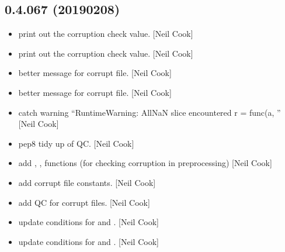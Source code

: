 \documentclass[a4paper,10pt,english]{report}
\begin{document}
\subsection{0.4.067 (2019\sphinxhyphen{}02\sphinxhyphen{}08)}
\label{\detokenize{misc/changelog:id210}}\begin{itemize}
\item {} 
 \sphinxhyphen{} print out the corruption check value. {[}Neil
Cook{]}

\item {} 
 \sphinxhyphen{} print out the corruption check value. {[}Neil
Cook{]}

\item {} 
 \sphinxhyphen{} better message for corrupt file. {[}Neil
Cook{]}

\item {} 
 \sphinxhyphen{} better message for corrupt file. {[}Neil
Cook{]}

\item {} 
 \sphinxhyphen{} catch warning “RuntimeWarning: All\sphinxhyphen{}NaN slice
encountered r = func(a, ” {[}Neil Cook{]}

\item {} 
 \sphinxhyphen{} pep8 tidy up of QC. {[}Neil Cook{]}

\item {} 
 \sphinxhyphen{} add , ,
 functions (for checking corruption in
preprocessing) {[}Neil Cook{]}

\item {} 
 \sphinxhyphen{} add corrupt file constants. {[}Neil Cook{]}

\item {} 
 \sphinxhyphen{} add QC for corrupt files. {[}Neil Cook{]}

\item {} 
 \sphinxhyphen{} update conditions for  and .
{[}Neil Cook{]}

\item {} 
 \sphinxhyphen{} update conditions for  and .
{[}Neil Cook{]}


\end{itemize}
\end{document}
